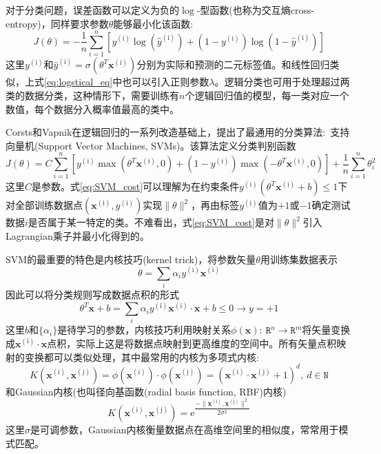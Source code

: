 \documentclass[10pt, oneside, a4paper]{article}      %
\newcommand{\upcite}[1]{\hspace{0ex}\textsuperscript{\cite{#1}}} %
\begin{document}
对于分类问题，误差函数可以定义为负的$\log$-型函数(也称为交互熵\textrm{cross-entropy})，同样要求参数$\theta$能够最小化该函数:
\begin{equation}
	J(\theta) = -\dfrac1n\sum_{i=1}^n[y^{(\mathrm{i})}\log(\hat{y}^{(\mathrm{i})})+(1-y^{(\mathrm{i})})\log(1-\hat{y}^{(\mathrm{i})})]
	\label{eq:logstical_eq}
\end{equation}
这里$y^{(\mathrm{i})}$和$\hat{y}^{(\mathrm{i})}=\sigma(\theta^T\mathbf{x}^{(\mathrm{i})})$分别为实际和预测的二元标签值。和线性回归类似，上式\eqref{eq:logstical_eq}中也可以引入正则参数$\lambda$。逻辑分类也可用于处理超过两类的数据分类，这种情形下，需要训练有$n$个逻辑回归值的模型，每一类对应一个数值，每个数据分入概率值最高的类中。

\textrm{Corsts}和\textrm{Vapnik}在逻辑回归的一系列改造基础上，提出了最通用的分类算法:~支持向量机\textrm{(Support Vector Machines, SVMs)}\upcite{ML20-273_1995}。该算法定义分类判别函数
\begin{equation}
	J(\theta)=C\sum_{i=1}^n[y^{(\mathrm{i})}\max(\theta^T\mathbf{x}^{(\mathrm{i})},0)+(1-y^{(\mathrm{i})})\max(-\theta^T\mathbf{x}^{(\mathrm{i})},0)]+\dfrac1n\sum_{i=1}^n\theta_i^2
	\label{eq:SVM_cost}
\end{equation}
这里$C$是参数。式\eqref{eq:SVM_cost}可以理解为在约束条件$y^{(\mathrm{i})}(\theta^T\mathbf{x}^{(\mathrm{i})}+b)\leqslant1$下对全部训练数据点$(\mathbf{x}^{(\mathrm{i})},y^{(\mathrm{i})})$实现$\|\theta\|^2$，再由标签$y^{(\mathrm{i})}$值为$+1$或$-1$确定测试数据$i$是否属于某一特定的类。不难看出，式\eqref{eq:SVM_cost}是对$\|\theta\|^2$引入\textrm{Lagrangian}乘子并最小化得到的。

\textrm{SVM}的最重要的特色是内核技巧\textrm{(kernel trick)}，将参数矢量$\theta$用训练集数据表示
\begin{displaymath}
	\theta=\sum_i\alpha_iy^{(\mathrm{i})}\mathbf{x}^{(\mathrm{i})}
\end{displaymath}
因此可以将分类规则写成数据点积的形式
\begin{equation}
	\theta^T\mathbf{x}+b=\sum_i\alpha_iy^{(\mathrm{i})}\mathbf{x}^{(\mathrm{i})}\cdot\mathbf{x}+b\leqslant0\rightarrow y=+1
	\label{eq:SVM_cp}
\end{equation}
这里$b$和$\{\alpha_i\}$是待学习的参数，内核技巧利用映射关系$\phi(\mathbf{x}):~\mathtt{R}^n\rightarrow\mathtt{R}^m$将矢量变换成$\mathbf{x}^{(\mathrm{i})}\cdot\mathbf{x}$点积，实际上这是将数据点映射到更高维度的空间中。所有矢量点积映射的变换都可以类似处理，其中最常用的内核为多项式内核:
\begin{displaymath}
	K(\mathbf{x}^{(\mathrm{i})},\mathbf{x}^{(\mathrm{j})})=\phi(\mathbf{x}^{(\mathrm{i})})\cdot\phi(\mathbf{x}^{(\mathrm{j})})=(\mathbf{x}^{(\mathrm{i})}\cdot\mathbf{x}^{(\mathrm{j})}+1)^d,~d\in\mathtt{N}
\end{displaymath}
和\textrm{Gaussian}内核(也叫径向基函数(\textrm{radial basis function, RBF})内核)
\begin{displaymath}
	K(\mathbf{x}^{(\mathrm{i})},\mathbf{x}^{(\mathrm{j})})=\mathrm{e}^{\dfrac{-\|\mathbf{x}^{(\mathrm{i})},\mathbf{x}^{(\mathrm{j})}\|^2}{2\sigma^2}}
\end{displaymath}
这里$\sigma$是可调参数，\textrm{Gaussian}内核衡量数据点在高维空间里的相似度，常常用于模式匹配。
\end{document}
